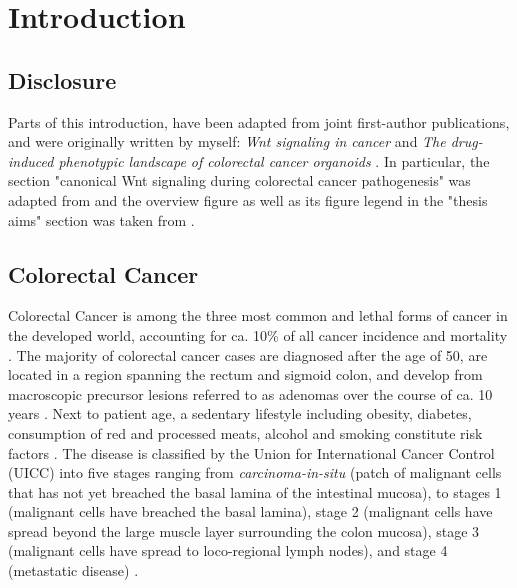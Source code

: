 \chapter{Introduction}
\label{introduction}
\begin{flushleft}
\setlength{\parindent}{7ex}
\section{Disclosure}
Parts of this introduction, have been adapted from joint first-author publications, and were originally written by myself: \textit{Wnt signaling in cancer} \parencite{zhanWntSignalingCancer2017} and \textit{The drug-induced phenotypic landscape of colorectal cancer organoids} \parencite{betgeDruginducedPhenotypicLandscape2022}. In particular, the section "canonical Wnt signaling during colorectal cancer pathogenesis" was adapted from \parencite{zhanWntSignalingCancer2017} and the overview figure as well as its figure legend in the "thesis aims" section was taken from \parencite{betgeDruginducedPhenotypicLandscape2022}.

\section{Colorectal Cancer}
Colorectal Cancer is among the three most common and lethal forms of cancer in the developed world, accounting for ca. 10\% of all cancer incidence and mortality \parencite{sungGlobalCancerStatistics2021}. The majority of colorectal cancer cases are diagnosed after the age of 50, are located in a region spanning the rectum and sigmoid colon, and develop from macroscopic precursor lesions referred to as adenomas over the course of ca. 10 years \parencite{choGeneticAlterationsAdenoma1992}. Next to patient age, a sedentary lifestyle including obesity, diabetes, consumption of red and processed meats, alcohol and smoking constitute risk factors \parencite{sungGlobalCancerStatistics2021}. The disease is classified by the Union for International Cancer Control (UICC) into five stages ranging from \textit{carcinoma-in-situ} (patch of malignant cells that has not yet breached the basal lamina of the intestinal mucosa), to stages 1 (malignant cells have breached the basal lamina), stage 2 (malignant cells have spread beyond the large muscle layer surrounding the colon mucosa), stage 3 (malignant cells have spread to loco-regional lymph nodes), and stage 4 (metastatic disease) \parencite{vancutsemESMOConsensusGuidelines2016a}.
\par


\end{flushleft}
